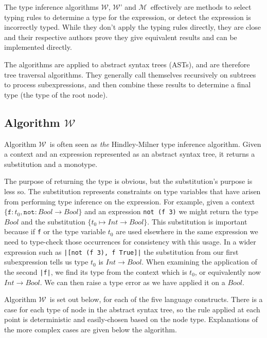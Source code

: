 \documentclass[a4paper,fleqn,oneside,12pt]{report}
\newcommand{\W}{$\mathcal{W}$}
\newcommand{\M}{$\mathcal{M}$}
\begin{document}
The type inference algorithms \W, \W’ and \M\ effectively are methods to select typing rules to determine a type for the expression, or detect the expression is incorrectly typed. While they don't apply the typing rules directly, they are close and their respective authors prove they give equivalent results and can be implemented directly.

The algorithms are applied to abstract syntax trees (ASTs), and are therefore tree traversal algorithms. They generally call themselves recursively on subtrees to process subexpressions, and then combine these results to determine a final type (the type of the root node).

\subsection{Algorithm \texorpdfstring{\W}{W}}

Algorithm \W\ is often seen as \textit{the} Hindley-Milner type inference algorithm. Given a context and an expression represented as an abstract syntax tree, it returns a substitution and a monotype.

The purpose of returning the type is obvious, but the substitution's purpose is less so. The substitution represents constraints on type variables that have arisen from performing type inference on the expression. For example, given a context $\{ \mathtt{f} : t_0, \mathtt{not} : Bool \rightarrow Bool \}$ and an expression \texttt{not (f 3)} we might return the type $Bool$ and the substitution $\{ t_0 \mapsto Int \rightarrow Bool \}$. This substitution is important because if \texttt{f} or the type variable $t_0$ are used elsewhere in the same expression we need to type-check those occurrences for consistency with this usage. In a wider expression such as \texttt{|[not (f 3), f True]|} the substitution from our first subexpression tells us type $t_0$ is $Int \rightarrow Bool$. When examining the application of the second \texttt{|f|}, we find its type from the context which is $t_0$, or equivalently now $Int \rightarrow Bool$. We can then raise a type error as we have applied it on a $Bool$.

Algorithm \W\ is set out below, for each of the five language constructs. There is a case for each type of node in the abstract syntax tree, so the rule applied at each point is deterministic and easily-chosen based on the node type. Explanations of the more complex cases are given below the algorithm.
\end{document}
